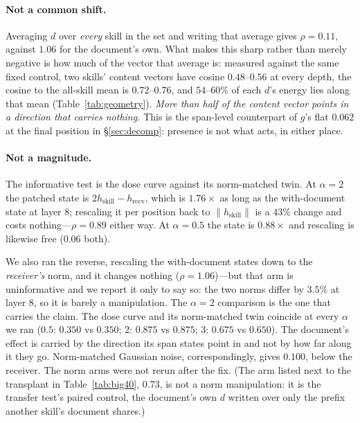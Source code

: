 \documentclass{article}
\newcommand{\dvec}{\ensuremath{d}}
\newcommand{\gvec}{\ensuremath{g}}
\begin{document}
\paragraph{Not a common shift.} Averaging $\dvec$ over \emph{every} skill in the
set and writing that average gives $\rho = 0.11$, against $1.06$ for the
document's own. What makes this sharp rather than merely negative
is how much of the vector that average is: measured against the same fixed
control, two skills' content vectors have cosine $0.48$--$0.56$ at every depth,
the cosine to the all-skill mean is $0.72$--$0.76$, and $54$--$60\%$ of each
$\dvec$'s energy lies along that mean (Table~\ref{tab:geometry}). \emph{More than
half of the content vector points in a direction that carries nothing.} This is
the span-level counterpart of $\gvec$'s flat $0.062$ at
the final position in \S\ref{sec:decomp}: presence is not what acts, in either
place.

\paragraph{Not a magnitude.} The informative test is the dose curve against its
norm-matched twin. At $\alpha = 2$ the patched state is $2h_{\text{skill}} -
h_{\text{recv}}$, which is $1.76\times$ as long as the with-document state at
layer 8; rescaling it per position back to $\|h_{\text{skill}}\|$ is a $43\%$
change and costs nothing---$\rho = 0.89$ either way. At $\alpha = 0.5$ the state
is $0.88\times$ and rescaling is likewise free ($0.06$ both).

We also ran the reverse, rescaling the with-document states down to the
\emph{receiver's} norm, and it changes nothing ($\rho = 1.06$)---but that arm is
uninformative and we report it only to say so: the two norms differ by $3.5\%$ at
layer 8, so it is barely a manipulation. The $\alpha = 2$ comparison is the one
that carries the claim. The dose curve and its norm-matched twin coincide
at every $\alpha$ we ran ($0.5$: $0.350$ vs $0.350$; $2$: $0.875$ vs $0.875$;
$3$: $0.675$ vs $0.650$). The document's effect is carried by the direction its
span states point in and not by how far along it they go. Norm-matched Gaussian
noise, correspondingly, gives $0.100$, below the receiver.
The norm arms were not rerun after the fix. (The arm listed next to the
transplant in Table~\ref{tab:big40}, $0.73$, is not a norm manipulation: it is
the transfer test's paired control, the document's own $\dvec$ written over only
the prefix another skill's document shares.)
\end{document}
